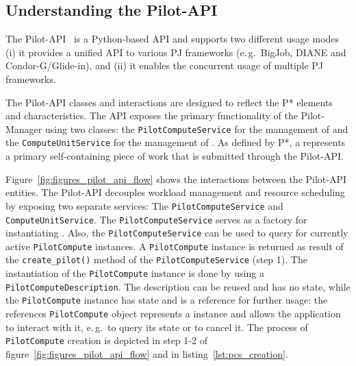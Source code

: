 \documentclass[conference]{IEEEtran}
\begin{document}


\subsection{Understanding the Pilot-API}


The Pilot-API~\cite{pilot_api} is a Python-based API and supports two different usage modes (i)
it provides a unified API to various PJ frameworks (e.\,g.\ BigJob, DIANE and
Condor-G/Glide-in), and (ii) it enables the concurrent usage of multiple PJ
frameworks.

The Pilot-API classes and interactions are designed to reflect the P*
elements and characteristics.
The API exposes the primary functionality of the Pilot-Manager using two
classes: the \texttt{Pilot\-Compute\-Service} for the management of \pilots
and the \texttt{Compute\-Unit\-Service} for the management of \cus. 
As defined by P*, a \cu represents a primary self-containing piece of work that
is submitted through the Pilot-API. 

Figure~\ref{fig:figures_pilot_api_flow} shows the interactions between the
Pilot-API entities. The Pilot-API decouples
workload management and resource scheduling by exposing two separate services: 
The \texttt{Pilot\-Compute\-Service} and
\texttt{Compute\-Unit\-Service}. 
The \texttt{Pilot\-Compute\-Service} serves as a factory for instantiating \pilots. 
Also, the \texttt{Pilot\-Compute\-Service} can be used to query for currently
active \texttt{Pilot\-Compute} instan\-ces.
A \texttt{Pilot\-Compute} instance is returned as result of the
\texttt{create\_pilot()} method of the \texttt{Pi\-lot\-Compute\-Service} (step 1).
The instantiation of the
\texttt{Pilot\-Compute} instance is done by using a
\texttt{Pilot\-ComputeDescription}. The description can be reused and has no
state, while the \texttt{Pilot\-Compute} instance has state and is a reference
for further usage:
the references \texttt{Pilot\-Compute} object represents a \pilot instance and allows the 
application to interact with it, e.\,g.\ to query its state or to cancel 
it. The process of \texttt{Pilot\-Compute} creation is depicted in step 1-2 of 
figure~\ref{fig:figures_pilot_api_flow} and in listing~\ref{lst:pcs_creation}.\\
\end{document}
